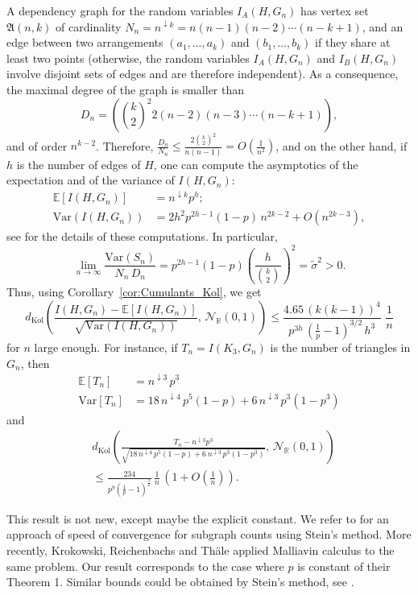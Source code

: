 \documentclass[envcountsame]{svmult}
\newcommand{\R}{\mathbb{R}}
\newcommand{\esper}{\mathbb{E}}
\newcommand{\dkol}{d_\mathrm{Kol}}
\newcommand{\var}{\mathrm{Var}}
\newcommand{\gauss}{\mathcal{N}_{\R}(0,1)}
\begin{document}
\begin{example}
A dependency graph for the random variables $I_A(H,G_n)$ has vertex set $\mathfrak{A}(n,k)$ of cardinality $N_n = n^{\downarrow k} =n(n-1)(n-2)\cdots (n-k+1)$, and an edge between two arrangements $(a_1,\ldots,a_k)$ and $(b_1,\ldots,b_k)$ if they share at least two points (otherwise, the random variables $I_A(H,G_n)$ and $I_B(H,G_n)$ involve disjoint sets of edges and are therefore independent). As a consequence, the maximal degree of the graph is smaller than
$$D_n=\left(\binom{k}{2}^2 2(n-2)(n-3)\cdots (n-k+1) \right),$$
and of order $n^{k-2}$. Therefore, $\frac{D_n}{N_n} \leq \frac{2 \binom{k}{2}^2}{n(n-1)} = O(\frac{1}{n^2})$, and on the other hand, if $h$ is the number of edges of $H$, one can compute the asymptotics of the expectation and of the variance of $I(H,G_n)$:
\begin{align*}
\esper[I(H,G_n)] &= n^{\downarrow k} p^h ;\\
 \var(I(H,G_n)) &= 2h^2p^{2h-1}(1-p)\,n^{2k-2} + O(n^{2k-3}),
\end{align*}
see \cite[Section 10]{FMN16} for the details of these computations. In particular,
$$\lim_{n \to \infty} \frac{\var(S_n)}{N_n\,D_n} = p^{2h-1}(1-p) \left(\frac{h}{\binom{k}{2}}\right)^{\!2} = \widetilde{\sigma}^2 >0. $$
Thus, using Corollary~\ref{cor:Cumulants_Kol}, we get
$$\dkol\left(\frac{I(H,G_n) - \esper[I(H,G_n)]}{\sqrt{\var(I(H,G_n))}},\,\gauss\right) \leq \frac{4.65\,(k(k-1))^4}{p^{3h}\,(\frac{1}{p}-1)^{3/2}\,h^3} \,\,\frac{1}{n} $$
for $n$ large enough. For instance, if $T_n=I(K_3,G_n)$ is the number of triangles in $G_n$, then
\begin{align*}
\esper[T_n]&=n^{\downarrow 3}\,p^3 \\
\var[T_n]&=18\,n^{\downarrow 4}\,p^5(1-p) + 6\,n^{\downarrow 3}\,p^3(1-p^3)
\end{align*}
and
\begin{align*}
&\dkol\left(\frac{T_n-n^{\downarrow 3}p^3}{\sqrt{18\,n^{\downarrow 4}\,p^5(1-p) + 6\,n^{\downarrow 3}\,p^3(1-p^3)}},\,\gauss\right) \\
&\leq \frac{234}{p^9(\frac{1}{p}-1)^{\frac{3}{2}}}\,\frac{1}{n} \, (1 +O(\tfrac1n)).
\end{align*}


\noindent 
This result is not new, except maybe the explicit constant.
We refer to \cite{BKR89} for an approach of speed of convergence for subgraph counts
using Stein's method.
More recently, Krokowski, Reichenbachs and Thäle \cite{KRT15} applied Malliavin 
calculus to the same problem.
Our result corresponds to the case where $p$ is constant of their Theorem 1. 
Similar bounds could be obtained by Stein's method, see \cite{Rin94}.
\end{example}
\end{document}
